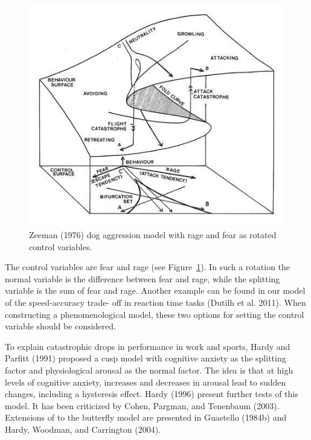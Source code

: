 \documentclass[
  a4paper,
  DIV=11,
  numbers=noendperiod,
  oneside]{scrreprt}
\begin{document}
\begin{figure}

{\centering \includegraphics{media/ch3/image17.jpg}

}

\caption{\label{fig-ch3-img17-old-29}Zeeman (1976) dog aggression model
with rage and fear as rotated control variables.}

\end{figure}

The control variables are fear and rage (see
Figure~\ref{fig-ch3-img17-old-29}). In such a rotation the normal
variable is the difference between fear and rage, while the splitting
variable is the sum of fear and rage. Another example can be found in
our model of the speed-accuracy trade- off in reaction time tasks
(Dutilh et al. 2011). When constructing a phenomenological model, these
two options for setting the control variable should be considered.

To explain catastrophic drops in performance in work and sports, Hardy
and Parfitt (1991) proposed a cusp model with cognitive anxiety as the
splitting factor and physiological arousal as the normal factor. The
idea is that at high levels of cognitive anxiety, increases and
decreases in arousal lead to sudden changes, including a hysteresis
effect. Hardy (1996) present further tests of this model. It has been
criticized by Cohen, Pargman, and Tenenbaum (2003). Extensions of to the
butterfly model are presented in Guastello (1984b) and Hardy, Woodman,
and Carrington (2004).
\end{document}
